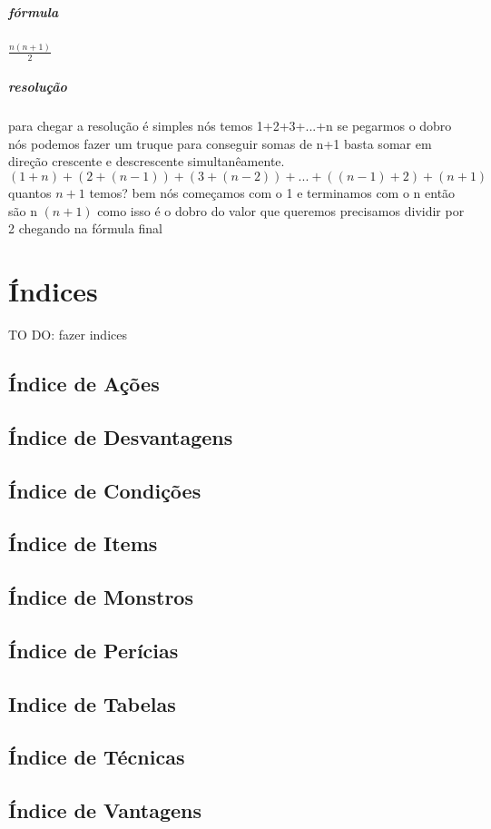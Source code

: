 \paragraph{fórmula} \(\frac{n(n+1)}{2}\)
\paragraph{resolução} para chegar a resolução é simples nós temos 1+2+3+...+n
se pegarmos o dobro nós podemos fazer um truque para conseguir somas de n+1 basta somar em direção crescente e descrescente simultanêamente.
\((1+n) + (2 + (n-1)) + (3 + (n-2))+ ... +((n-1)+2) + (n+1)\)
quantos \(n+1\) temos? bem nós começamos com o 1 e terminamos com o n
então são n \((n+1)\) como isso é o dobro do valor que queremos precisamos dividir por 2 chegando na fórmula final 
\chapter{Índices}
TO DO: fazer indices
\section{Índice de Ações}
\section{Índice de Desvantagens}
\section{Índice de Condições}
\section{Índice de Items}
\section{Índice de Monstros}
\section{Índice de Perícias}
\section{Indice de Tabelas}
\listoftables
\section{Índice de Técnicas}
\section{Índice de Vantagens}
